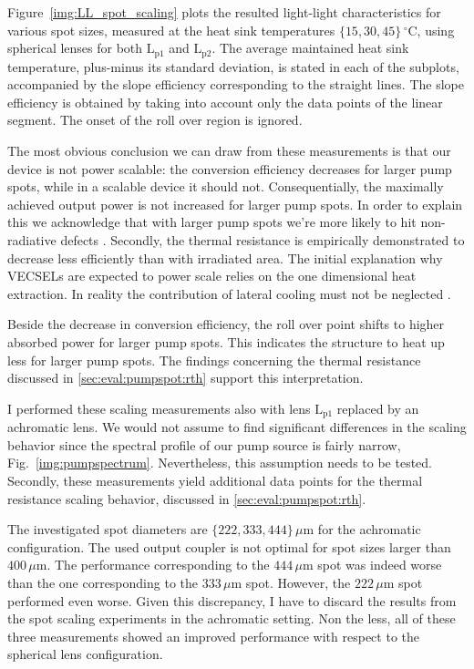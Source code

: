 Figure~\ref{img:LL_spot_scaling}
plots the resulted
light-light characteristics
for various spot sizes,
measured at the heat sink temperatures
$\{15,30,45\}\,^\circ\mathrm{C}$,
using spherical lenses
for both $\mathrm{L}_\mathrm{p1}$ and $\mathrm{L}_\mathrm{p2}$.
The average maintained heat sink temperature,
plus-minus its standard deviation,
is stated in each of the subplots,
accompanied by the slope efficiency
corresponding to
the straight lines.
The slope efficiency
is obtained
by taking into account
only the data points
of the linear segment.
The onset of
the roll over region
is ignored.

The most obvious conclusion
we can draw from these measurements
is that
our device is not power scalable:
the conversion efficiency
decreases for larger pump spots,
while in a scalable device
it should not.
Consequentially,
the maximally achieved
output power
is not increased
for larger pump spots.
In order to explain this
we acknowledge that
with larger pump spots
we're more likely
to hit non-radiative defects
\cite{Korpi2010}.
Secondly,
the thermal resistance
is empirically demonstrated
to decrease less efficiently
than with irradiated area.
The initial explanation
why VECSELs are expected
to power scale
relies on the one dimensional
heat extraction.
In reality
the contribution
of lateral cooling
must not be neglected
\cite{Chernikov2011}.

Beside the decrease
in conversion efficiency,
the roll over point
shifts to higher absorbed power
for larger pump spots.
This indicates
the structure
to heat up less
for larger pump spots.
The findings
concerning the thermal resistance
discussed in \ref{sec:eval:pumpspot:rth}
support this interpretation.

I performed
these scaling measurements
also with lens
$\mathrm{L}_\mathrm{p1}$
replaced by
an achromatic lens.
We would not assume
to find significant
differences
in the scaling behavior
since the spectral profile
of our pump source
is fairly narrow,
Fig.~\ref{img:pumpspectrum}.
Nevertheless,
this assumption needs to be tested.
Secondly,
these measurements yield
additional data points
for the thermal resistance
scaling behavior,
discussed in \ref{sec:eval:pumpspot:rth}.

The investigated spot diameters
are $\{222,333,444\}\,\mu\mathrm{m}$
for the achromatic configuration.
The used output coupler
is not optimal
for spot sizes larger than
$400\,\mu\mathrm{m}$.
The performance
corresponding to
the $444\,\mu\mathrm{m}$ spot
was indeed worse
than the one 
corresponding to
the $333\,\mu\mathrm{m}$ spot.
However,
the $222\,\mu\mathrm{m}$ spot
performed even worse.
Given this discrepancy,
I have to discard
the results
from the spot scaling experiments
in the achromatic setting.
Non the less,
all of these three measurements
showed an improved performance
with respect to
the spherical lens configuration.


